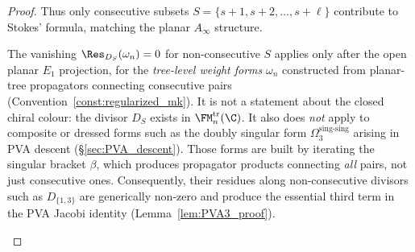 \begin{proof}
Thus only consecutive subsets $S = \{s{+}1, s{+}2, \ldots, s{+}\ell\}$ contribute to Stokes' formula, matching the planar $A_\infty$ structure.

\begin{remark}
\label{rem:non-consecutive-scope}
The vanishing \(\Res_{D_S}(\omega_n)=0\) for non-consecutive \(S\)
applies only after the open planar \(E_1\) projection, for the
\emph{tree-level weight forms} \(\omega_n\) constructed from
planar-tree propagators connecting consecutive pairs
(Convention~\ref{const:regularized_mk}). It is not a statement about
the closed chiral colour: the divisor \(D_S\) exists in
\(\FM_n^{\mathrm{tr}}(\C)\). It also does \emph{not} apply to
composite or dressed forms such as the doubly singular form
\(\Omega_3^{\mathrm{sing}\text{-}\mathrm{sing}}\) arising in PVA
descent (\S\ref{sec:PVA_descent}). Those forms are built by iterating
the singular bracket \(\beta\), which produces propagator products
connecting \emph{all} pairs, not just consecutive ones. Consequently,
their residues along non-consecutive divisors such as
\(D_{\{1,3\}}\) are generically non-zero and produce the essential
third term in the PVA Jacobi identity (Lemma~\ref{lem:PVA3_proof}).
\end{remark}


\end{proof}
